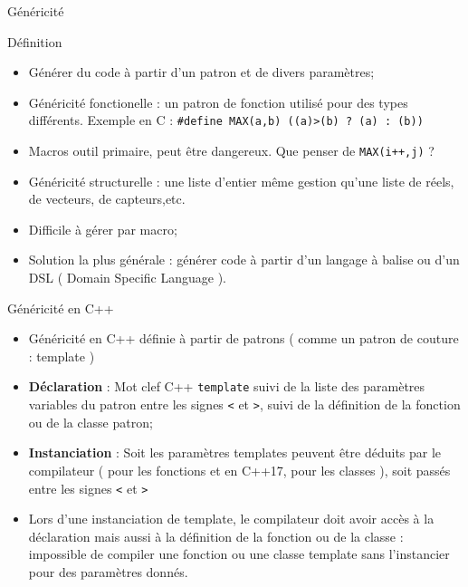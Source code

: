 \documentclass[handout,10pt]{beamer}
\begin{document}
\begin{frame}[fragile]{Généricité}
\tiny
\begin{block}{Définition}
\begin{itemize}
\item Générer du code à partir d'un patron et de divers paramètres;
\item {\color{blue}Généricité fonctionelle} : un patron de fonction utilisé pour des types différents. Exemple en C : \lstinline$#define MAX(a,b) ((a)>(b) ? (a) : (b))$
\item Macros outil primaire, peut être dangereux. Que penser de \lstinline$MAX(i++,j)$ ?
\item {\color{blue}Généricité structurelle} : une liste d'entier même gestion qu'une liste de réels, de vecteurs, de capteurs,etc.
\item Difficile à gérer par macro;
\item Solution la plus générale : générer code à partir d'un langage à balise ou d'un DSL ( Domain Specific Language ).
\end{itemize}
\end{block}

\begin{block}{Généricité en C++}
\begin{itemize}
\item Généricité en C++ définie à partir de patrons ( comme un patron de couture : template )
\item \textbf{Déclaration} : Mot clef C++ \lstinline$template$ suivi de la liste des paramètres variables du patron entre les signes \lstinline$<$
et \lstinline$>$, suivi de la définition de la fonction ou de la classe patron;
\item \textbf{Instanciation} : Soit les paramètres templates peuvent être déduits par le compilateur ( pour les fonctions et en C++17, pour les classes ), soit passés entre les signes \lstinline$<$ et \lstinline$>$
\item Lors d'une instanciation de template, le compilateur doit avoir accès à la déclaration mais aussi à la définition de la fonction ou de la classe : impossible de compiler une fonction ou une classe template sans l'instancier pour des paramètres donnés.
\end{itemize}
\end{block}

\end{frame}
\end{document}
